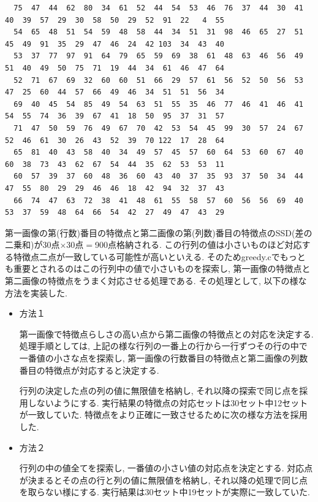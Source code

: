\documentclass[a4j]{jarticle}
\begin{document}
{\begin{verbatim}
  75  47  44  62  80  34  61  52  44  54  53  46  76  37  44  30  41  40  39  57  29  30  58  50  29  52  91  22   4  55
  54  65  48  51  54  59  48  58  44  34  51  31  98  46  65  27  51  45  49  91  35  29  47  46  24  42 103  34  43  40
  53  37  77  97  91  64  79  65  59  69  38  61  48  63  46  56  49  51  40  49  50  75  71  19  44  34  61  46  47  64
  52  71  67  69  32  60  60  51  66  29  57  61  56  52  50  56  53  47  25  60  44  57  66  49  46  34  51  51  56  34
  69  40  45  54  85  49  54  63  51  55  35  46  77  46  41  46  41  54  55  74  36  39  67  41  18  50  95  37  31  57
  71  47  50  59  76  49  67  70  42  53  54  45  99  30  57  24  67  52  46  61  30  26  43  52  39  70 122  17  28  64
  65  81  40  43  58  40  34  49  57  45  57  60  64  53  60  67  40  60  38  73  43  62  67  54  44  35  62  53  53  11
  60  57  39  37  60  48  36  60  43  40  37  35  93  37  50  34  44  47  55  80  29  29  46  46  18  42  94  32  37  43
  66  74  47  63  72  38  41  48  61  55  58  57  60  56  56  69  40  53  37  59  48  64  66  54  42  27  49  47  43  29

\end{verbatim}
}

第一画像の第(行数)番目の特徴点と第二画像の第(列数)番目の特徴点のSSD(差の二乗和)が30点$×$30点$=$900点格納される. 
この行列の値は小さいものほど対応する特徴点二点が一致している可能性が高いといえる. 
そのためgreedy.cでもっとも重要とされるのはこの行列中の値で小さいものを探索し, 第一画像の特徴点と第二画像の特徴点をうまく対応させる処理である. 
その処理として, 以下の様な方法を実装した.

\begin{itemize}
\item{方法１}

第一画像で特徴点らしさの高い点から第二画像の特徴点との対応を決定する. 
処理手順としては, 上記の様な行列の一番上の行から一行ずつその行の中で一番値の小さな点を探索し, 第一画像の行数番目の特徴点と第二画像の列数番目の特徴点が対応すると決定する. 

行列の決定した点の列の値に無限値を格納し, それ以降の探索で同じ点を採用しないようにする. 
実行結果の特徴点の対応セットは30セット中12セットが一致していた.
特徴点をより正確に一致させるために次の様な方法を採用した.

\item{方法２}

行列の中の値全てを探索し, 一番値の小さい値の対応点を決定とする.
対応点が決まるとその点の行と列の値に無限値を格納し, それ以降の処理で同じ点を取らない様にする. 
実行結果は30セット中19セットが実際に一致していた. 
\end{itemize}
\end{document}
